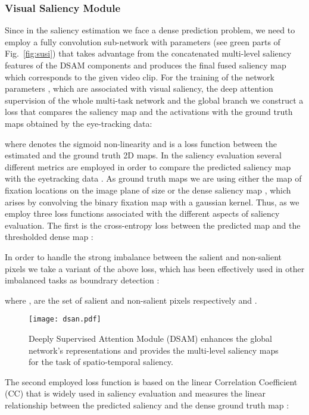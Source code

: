 \documentclass[10pt,twocolumn,letterpaper]{article}
\begin{document}
\subsubsection{Visual Saliency Module}
Since in the saliency estimation we face a dense prediction problem, we need to employ a fully convolution sub-network with parameters  (see green parts of Fig.~\ref{fig:susi}) that takes advantage from the concatenated multi-level saliency features  of the DSAM components and  produces the final fused saliency map  which corresponds to the given video clip. For the training of the network parameters , which are associated with visual saliency, the deep attention supervision of the whole multi-task network and the global branch we construct a loss that compares the saliency map  and the activations  with the ground truth maps  obtained by the eye-tracking data:

where  denotes the sigmoid non-linearity and  is a loss function between the estimated and the ground truth 2D maps. In the saliency evaluation several different metrics are employed in order to compare the predicted saliency map  with the eyetracking data \cite{bylinskii2016different}. As ground truth maps we are using either the map of fixation locations  on the image plane of size  or the dense saliency map , which arises by convolving the binary fixation map with a gaussian kernel. Thus, as  we employ three loss functions associated with the different aspects of saliency evaluation. The first is the cross-entropy loss between the predicted map  and the thresholded dense map :

In order to handle the strong imbalance between the salient and non-salient pixels we take a variant of the above loss, which has been effectively used in other imbalanced tasks as boundrary detection \cite{xie2015holistically,kokkinos2015pushing,maninis2016convolutional}: 

where ,  are the set of salient and non-salient pixels respectively and .
\begin{figure}[t]
\begin{center}
\texttt{[image: dsan.pdf]}
\end{center}
\caption{Deeply Supervised Attention Module (DSAM) enhances the global network's representations and provides the multi-level saliency maps for the task of spatio-temporal saliency.}
\label{fig:dsam}
\end{figure}
The second employed loss function is based on the linear Correlation Coefficient (CC) that is widely used in saliency evaluation and measures the linear relationship between the predicted saliency  and the dense ground truth map :
 
\end{document}
